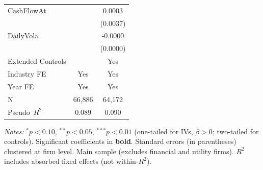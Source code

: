\begin{landscape}
\begin{table}[H]
\begin{tabular}{lcc}
CashFlowAt &  & 0.0003 \\
 &  & (0.0037) \\
DailyVola &  & -0.0000 \\
 &  & (0.0000) \\
\midrule
Extended Controls &  & Yes \\
Industry FE & Yes & Yes \\
Year FE & Yes & Yes \\
\midrule
N & 66,886 & 64,172 \\
Pseudo~$R^2$ & 0.089 & 0.090 \\
\bottomrule
\end{tabular}
\begin{minipage}{\linewidth}
\vspace{2pt}\scriptsize
\textit{Notes:} $^{*}p<0.10$, $^{**}p<0.05$, $^{***}p<0.01$ (one-tailed for IVs, $\beta > 0$; two-tailed for controls).
 Significant coefficients in \textbf{bold}.
 Standard errors (in parentheses) clustered at firm level.
 Main sample (excludes financial and utility firms).
 $R^2$ includes absorbed fixed effects (not within-$R^2$).
\end{minipage}
\end{table}
\end{landscape}